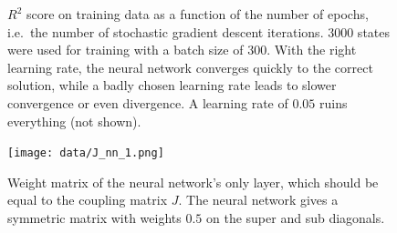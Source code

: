 \documentclass[11pt,british,a4paper]{article}
\numberwithin{equation}{section}
\begin{document}
\begin{figure}[H]
    \centering
    \caption{\(R^2\) score on training data as a function of the number of epochs, i.e.\ the number of stochastic gradient descent iterations. \(\num{3000}\) states were used for training with a batch size of \(300\). With the right learning rate, the neural network converges quickly to the correct solution, while a badly chosen learning rate leads to slower convergence or even divergence. A learning rate of \(\num{0.05}\) ruins everything (not shown).}\label{fig:r2nn}
\end{figure}

\begin{figure}[H]
    \centering
    \texttt{[image: data/J\_nn\_1.png]}
    \caption{Weight matrix of the neural network's only layer, which should be equal to the coupling matrix \(J\). The neural network gives a symmetric matrix with weights \(\num{0.5}\) on the super and sub diagonals.}
\end{figure}

\begin{table}[H]
    \centering
\end{table}

\clearpage
\appendix
\end{document}
